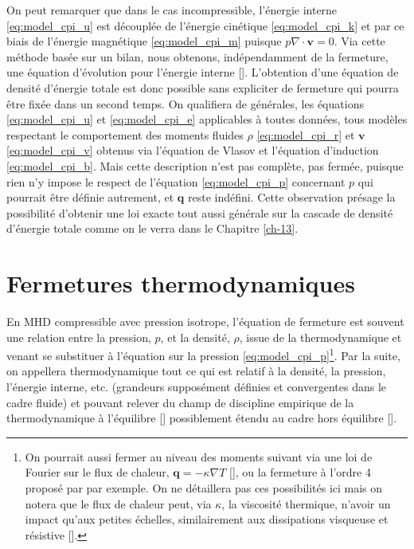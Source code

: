 On peut remarquer que dans le cas incompressible, l'énergie interne \eqref{eq:model_cpi_u} est découplée de l'énergie cinétique \eqref{eq:model_cpi_k} et par ce biais de l'énergie magnétique \eqref{eq:model_cpi_m} puisque $p \nabla \cdot \boldsymbol{v} = 0$. Via cette méthode basée sur un bilan, nous obtenons, indépendamment de la fermeture, une équation d'évolution pour l'énergie interne [\cite{eckart_thermodynamics_1940}]. L'obtention d'une équation de densité d'énergie totale est donc possible sans expliciter de fermeture qui pourra être fixée dans un second temps. On qualifiera de générales, les équations \eqref{eq:model_cpi_u} et \eqref{eq:model_cpi_e} applicables à toutes données, tous modèles respectant le comportement des moments fluides $\rho$ \eqref{eq:model_cpi_r} et $\boldsymbol{v}$ \eqref{eq:model_cpi_v} obtenus via l'équation de Vlasov et l'équation d'induction \eqref{eq:model_cpi_b}. Mais cette description n'est pas complète, pas fermée, puisque rien n'y impose le respect de l'équation \eqref{eq:model_cpi_p} concernant $p$ qui pourrait être définie autrement, et $\boldsymbol{q}$ reste indéfini. Cette observation présage la possibilité d'obtenir une loi exacte tout aussi générale sur la cascade de densité d'énergie totale comme on le verra dans le Chapitre \ref{ch-13}. 

\section{Fermetures thermodynamiques}
\label{sec-122}
En MHD compressible avec pression isotrope, l'équation de fermeture est souvent une relation entre la pression, $p$, et la densité, $\rho$, issue de la thermodynamique et venant se substituer à l'équation sur la pression \eqref{eq:model_cpi_p}\footnote{On pourrait aussi fermer au niveau des moments suivant via une loi de Fourier sur le flux de chaleur, $\boldsymbol{q} = - \kappa \nabla T$ [\cite{belmont_introduction_2018}], ou la fermeture à l'ordre 4 proposé par \cite{chust_closure_2006} par exemple. On ne détaillera pas ces possibilités ici mais on notera que le flux de chaleur peut, via $\kappa$, la viscosité thermique, n'avoir un impact qu'aux petites échelles, similairement aux dissipations visqueuse et résistive [\cite{eyink_cascades_2018}].}. Par la suite, on appellera thermodynamique tout ce qui est relatif à la densité, la pression, l'énergie interne, etc. (grandeurs supposément définies et convergentes dans le cadre fluide) et pouvant relever du champ de discipline empirique de la thermodynamique à l'équilibre [\cite{borel_thermodynamique_2005}]  possiblement étendu au cadre hors équilibre [\cite{livadiotis_non-equilibrium_2012}].

